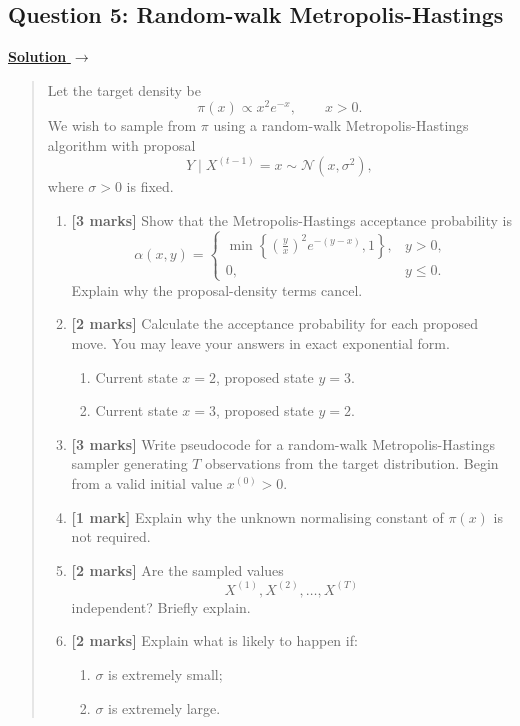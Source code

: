 \documentclass[11pt,a4paper]{article}
\newcommand{\given}{\mathrel{|}}
\newenvironment{examquestion}[2]
  {\subsection{#1}\label{question:\arabic{subsection}}\label{#2}%
   \noindent\hyperref[answer:\arabic{subsection}]{\textbf{Solution} $\rightarrow$}%
   \begin{quote}\color{statgrey}}
  {\end{quote}}
\begin{document}
\clearpage

\begin{examquestion}{Question 5: Random-walk Metropolis-Hastings}{question:practice-random-walk-metropolis-hastings}
Let the target density be
\[
  \pi(x)\propto x^2e^{-x},
  \qquad x>0.
\]
We wish to sample from $\pi$ using a random-walk Metropolis-Hastings
algorithm with proposal
\[
  Y\given X^{(t-1)}=x\sim\mathcal{N}(x,\sigma^2),
\]
where $\sigma>0$ is fixed.

\begin{enumerate}[label=(\alph*)]
  \item \textbf{[3 marks]} Show that the Metropolis-Hastings acceptance
        probability is
        \[
          \alpha(x,y)
          =
          \begin{cases}
            \displaystyle
            \min\left\{
              \left(\frac{y}{x}\right)^2 e^{-(y-x)},1
            \right\}, & y>0,\\[1.2em]
            0, & y\leq0.
          \end{cases}
        \]
        Explain why the proposal-density terms cancel.

  \item \textbf{[2 marks]} Calculate the acceptance probability for each
        proposed move. You may leave your answers in exact exponential form.
        \begin{enumerate}[label=\arabic*.]
          \item Current state $x=2$, proposed state $y=3$.
          \item Current state $x=3$, proposed state $y=2$.
        \end{enumerate}

  \item \textbf{[3 marks]} Write pseudocode for a random-walk
        Metropolis-Hastings sampler generating $T$ observations from the
        target distribution. Begin from a valid initial value $x^{(0)}>0$.

  \item \textbf{[1 mark]} Explain why the unknown normalising constant of
        $\pi(x)$ is not required.

  \item \textbf{[2 marks]} Are the sampled values
        \[
          X^{(1)},X^{(2)},\ldots,X^{(T)}
        \]
        independent? Briefly explain.

  \item \textbf{[2 marks]} Explain what is likely to happen if:
        \begin{enumerate}[label=\arabic*.]
          \item $\sigma$ is extremely small;
          \item $\sigma$ is extremely large.
        \end{enumerate}
\end{enumerate}
\end{examquestion}
\end{document}
